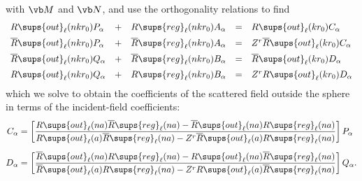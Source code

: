 \documentclass[letterpaper]{article}
\newcommand{\RBar}{\overline{R}}
\begin{document}
with $\vb M$ and $\vb N$, and use the orthogonality relations
to find
$$\begin{array}{lclcl}
  R\sups{out}_\ell(n k r_0) P_\alpha
 &+&
  R\sups{reg}_\ell(n k r_0) A_\alpha
 &=&
  R\sups{out}_\ell(k r_0) C_\alpha
\\[5pt]
  \RBar\sups{out}_\ell(n k r_0) P_\alpha
 &+&
  \RBar\sups{reg}_\ell(n k r_0) A_\alpha
 &=&
  Z^r \RBar\sups{out}_\ell(k r_0) C_\alpha
\\[5pt]
  \RBar\sups{out}_\ell(n k r_0) Q_\alpha
 &+&
  \RBar\sups{reg}_\ell(n k r_0) B_\alpha
 &=&
  \RBar\sups{out}_\ell(k r_0) D_\alpha
\\[5pt]
  R\sups{out}_\ell(n k r_0) Q_\alpha
 &+& 
  R\sups{reg}_\ell(n k r_0) B_\alpha
 &=& 
  Z^r R\sups{out}_\ell(k r_0) D_\alpha
\end{array}$$
which we solve to obtain the coefficients of the scattered
field outside the sphere in terms of the incident-field 
coefficients:
\begin{subequations}
\begin{align}
 C_\alpha 
&= \left[
   \frac{ R\sups{out}_\ell(na) \RBar\sups{reg}_\ell(na)
         -\RBar\sups{out}_\ell(na) R\sups{reg}_\ell(na)
        }
        { R\sups{out}_\ell(a) \RBar\sups{reg}_\ell(na)
         -Z^r\RBar\sups{out}_\ell(a) R\sups{reg}_\ell(na)
        }
    \right] P_\alpha
\\[5pt]
 D_\alpha 
&= \left[
   \frac{ \RBar\sups{out}_\ell(na) R\sups{reg}_\ell(na)
         -R\sups{out}_\ell(na) \RBar\sups{reg}_\ell(na)
        }
        { \RBar\sups{out}_\ell(a) R\sups{reg}_\ell(na)
         -Z^r R\sups{out}_\ell(a) \RBar\sups{reg}_\ell(na)
        }
    \right] Q_\alpha.
\end{align}
\label{CDAlpha}
\end{subequations}

\newpage
\end{document}
